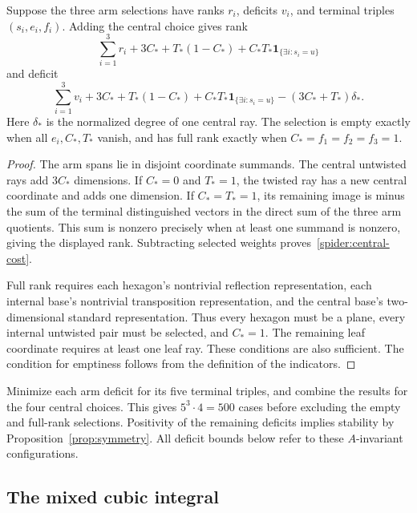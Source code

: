 \begin{lemma}\label{spider:rank}
Suppose the three arm selections have ranks $r_i$, deficits $v_i$,
and terminal triples $(s_i,e_i,f_i)$. Adding the central choice gives
rank
\[
 \sum_{i=1}^3r_i+3C_*+T_*(1-C_*)
       +C_*T_*\mathbf1_{\{\exists i:s_i=u\}}
\]
and deficit
\begin{equation}\label{spider:central-cost}
 \sum_{i=1}^3v_i+3C_*+T_*(1-C_*)
 +C_*T_*\mathbf1_{\{\exists i:s_i=u\}}
 -(3C_*+T_*)\delta_*.
\end{equation}
Here $\delta_*$ is the normalized degree of one central ray. The
selection is empty exactly when all $e_i,C_*,T_*$ vanish, and has full
rank exactly when $C_*=f_1=f_2=f_3=1$.
\end{lemma}
\begin{proof}
The arm spans lie in disjoint coordinate summands. The central untwisted
rays add $3C_*$ dimensions. If $C_*=0$ and $T_*=1$, the twisted ray has a new
central coordinate and adds one dimension. If $C_*=T_*=1$, its remaining
image is minus the sum of the terminal distinguished vectors in the
direct sum of the three arm quotients. This sum is nonzero precisely
when at least one summand is nonzero, giving the displayed rank.
Subtracting selected weights proves~\eqref{spider:central-cost}.

Full rank requires each hexagon's nontrivial reflection representation,
each internal base's nontrivial transposition representation, and the
central base's two-dimensional standard representation. Thus every
hexagon must be a plane, every internal untwisted pair must be selected,
and $C_*=1$. The remaining leaf coordinate requires at least one leaf
ray. These conditions are also sufficient. The condition for emptiness follows
from the definition of the indicators.
\end{proof}

Minimize each arm deficit for its five terminal triples, and combine
the results for the four central choices. This gives $5^3\cdot4=500$
cases before excluding the empty and full-rank selections. Positivity of
the remaining deficits
implies stability by Proposition~\ref{prop:symmetry}. All deficit bounds below
refer to these $A$-invariant configurations.

\subsection{The mixed cubic integral}

